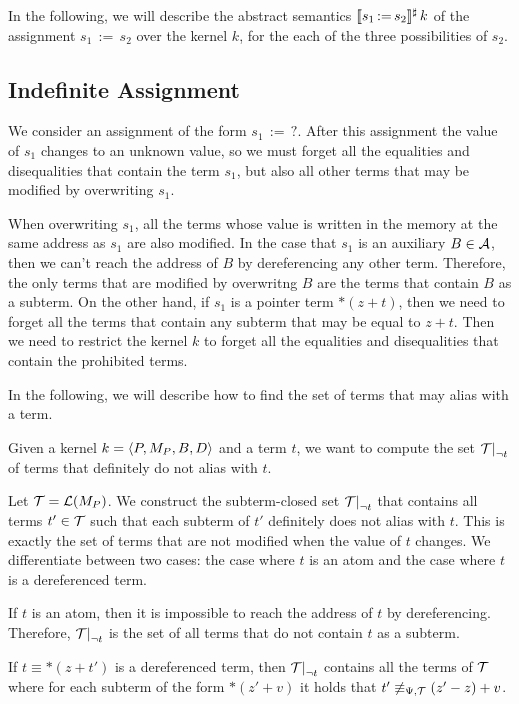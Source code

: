 In the following, we will describe the abstract semantics $\llbracket s_1\,{:=}\,s_2\rrbracket^\sharp\,k$ of the assignment $s_1\,{:=}\,s_2$ over the kernel $k$, for the each of the three possibilities of $s_2$.

\subsection{Indefinite Assignment}

We consider an assignment of the form $s_1\,{:=}\,?$.
After this assignment the value of $s_1$ changes to an unknown value, so we must forget all the equalities and disequalities that contain the term $s_1$, but also all other terms that may be modified by overwriting $s_1$.

When overwriting $s_1$, all the terms whose value is written in the memory at the same address as $s_1$ are also modified.
In the case that $s_1$ is an auxiliary $B \in \mathcal{A}$, then we can't reach the address of $B$ by dereferencing any other term.
Therefore, the only terms that are modified by overwritng $B$ are the terms that contain $B$ as a subterm.
On the other hand, if $s_1$ is a pointer term $*(z+t)$, then we need to forget all the terms that contain any subterm that may be equal to $z+t$.
Then we need to restrict the kernel $k$ to forget all the equalities and disequalities that contain the prohibited terms.

In the following, we will describe how to find the set of terms that may alias with a term.

Given a kernel $k = \langle P, M_P, B, D\rangle$ and a term $t$, we want to compute the set $\restr{\T}{\neg t}$ of terms that definitely do not alias with $t$.


Let $\mathcal{T} = \mathcal{L}(M_P)$. We construct the subterm-closed set $\restr{\T}{\neg t}$ that contains all terms $t' \in \mathcal{T}$ such that each subterm of $t'$ definitely does not alias with $t$.
This is exactly the set of terms that are not modified when the value of $t$ changes.
We differentiate between two cases: the case where $t$ is an atom and the case where $t$ is a dereferenced term.

If $t$ is an atom, then it is impossible to reach the address of $t$ by dereferencing.
Therefore, $\restr{\T}{\neg t}$ is the set of all terms that do not contain $t$ as a subterm.

If $t \equiv *(z + t')$ is a dereferenced term, then $\restr{\T}{\neg t}$ contains all the terms of $\mathcal{T}$ where for each subterm of the form $*(z' + v)$ it holds that $t' \not\equiv_{\Psi,\mathcal{T}} (z' - z) + v$.

